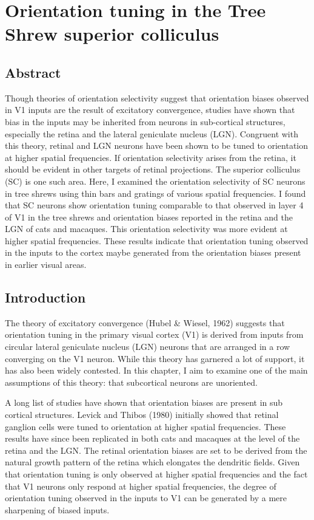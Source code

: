

	\chapter{Orientation tuning in the Tree Shrew superior colliculus}

	\pagebreak
	\section{Abstract}
	
	Though theories of orientation selectivity suggest that orientation biases observed in V1 inputs are the result of excitatory convergence, studies have shown that bias in the inputs may be inherited from neurons in sub-cortical structures, especially the retina and the lateral geniculate nucleus (LGN). Congruent with this theory, retinal and LGN neurons have been shown to be tuned to orientation at higher spatial frequencies. If orientation selectivity arises from the retina, it should be evident in other targets of retinal projections. The superior colliculus (SC) is one such area. Here, I examined the orientation selectivity of SC neurons in tree shrews using thin bars and gratings of various spatial frequencies. I found that SC neurons show orientation tuning comparable to that observed in layer 4 of V1 in the tree shrews and orientation biases reported in the retina and the LGN of cats and macaques. This orientation selectivity was more evident at higher spatial frequencies. These results indicate that orientation tuning observed in the inputs to the cortex maybe generated from the orientation biases present in earlier visual areas.\cite{Swisher2010}
	
	\pagebreak
	
	
	\section{Introduction}
	
	 The theory of excitatory convergence (Hubel \& Wiesel, 1962) suggests that orientation tuning in the primary visual cortex (V1) is derived from inputs from circular lateral geniculate nucleus (LGN) neurons that are arranged in a row converging on the V1 neuron. While this theory has garnered a lot of support, it has also been widely contested. In this chapter, I aim to examine one of the main assumptions of this theory: that subcortical neurons are unoriented.
	 
	 A long list of studies have shown that orientation biases are present in sub cortical structures. Levick and Thibos (1980) initially showed that retinal ganglion cells were tuned to orientation at higher spatial frequencies. These results have since been replicated in both cats and macaques at the level of the retina and the LGN. The retinal orientation biases are set to be derived from the natural growth pattern of the retina which elongates the dendritic fields. Given that orientation tuning is only observed at higher spatial frequencies and the fact that V1 neurons only respond at higher spatial frequencies, the degree of orientation tuning observed in the inputs to V1 can be generated by a mere sharpening of biased inputs.
	 	
